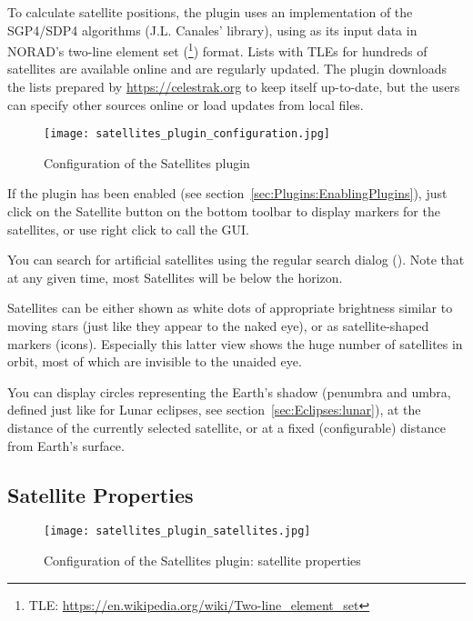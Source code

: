 To calculate satellite positions, the plugin uses an implementation of
the SGP4/SDP4 algorithms (J.L. Canales'  library), using
as its input data in NORAD's two-line element set
(\footnote{TLE: \url{https://en.wikipedia.org/wiki/Two-line_element_set}})
format. Lists with TLEs for hundreds of satellites are available
online and are regularly updated. The plugin downloads the lists
prepared by \url{https://celestrak.org} to keep itself up-to-date, but the users can
specify other sources online or load updates from local files.

\begin{figure}[htbp]
	\centering\texttt{[image: satellites\_plugin\_configuration.jpg]}
	\caption{Configuration of the Satellites plugin}
	\label{fig:plugins:Satellites:Configuration}
\end{figure}

If the plugin has been enabled (see
section~\ref{sec:Plugins:EnablingPlugins}), just click on the
Satellite button   on the bottom
toolbar to display markers for the satellites, or use right click to call the GUI.

You can search for artificial satellites using
the regular search dialog (). Note that at any given time, most
Satellites will be below the horizon.

Satellites can be either shown as white dots of appropriate brightness
similar to moving stars (just like they appear to the naked eye), or
as satellite-shaped markers (icons). Especially this latter view shows
the huge number of satellites in orbit, most of which are invisible to
the unaided eye.

You can display  circles representing the Earth's
shadow (penumbra and umbra, defined just like for Lunar eclipses, see
section~\ref{sec:Eclipses:lunar}), at the distance of the currently
selected satellite, or at a fixed (configurable) distance from Earth's surface.

\subsection{Satellite Properties}
\label{sec:plugins:Satellites:properties}

\begin{figure}[tbp]
	\centering\texttt{[image: satellites\_plugin\_satellites.jpg]}
	\caption{Configuration of the Satellites plugin: satellite properties}
	\label{fig:plugins:Satellites:Configuration:Satellites}
\end{figure}


